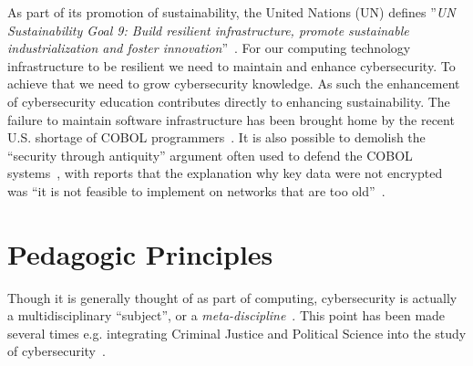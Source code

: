 \documentclass[conference]{IEEEtran}
\begin{document}
As part of its promotion of sustainability, the United Nations (UN)
defines ''{\em{UN Sustainability Goal 9: Build resilient
infrastructure, promote sustainable industrialization and foster
innovation}}''~\cite{UNgoal9}. For our computing technology
infrastructure to be resilient we need to maintain and enhance
cybersecurity. To achieve that we need to grow cybersecurity
knowledge. As such the enhancement of cybersecurity education
contributes directly to enhancing sustainability. The failure to
maintain software infrastructure has been brought home by the recent
U.S. shortage of COBOL programmers~\cite{Shein2020e}.  It is also
possible to demolish the ``security through antiquity'' argument often
used to defend the COBOL systems~\cite{PangTanriverdi2017a}, with
reports that the explanation why key data were not encrypted was ``it
is not feasible to implement on networks that are too
old''~\cite{Sternstein2015a}.


\section{Pedagogic Principles}

Though it is generally thought of as part of computing, cybersecurity
is actually a multidisciplinary ``subject'', or a
\emph{meta-discipline}~\cite{Parrishetal2018a}. This point has been
made several times e.g. integrating Criminal Justice and Political Science into the study of cybersecurity~\cite{Stockman2013}.  
\end{document}
